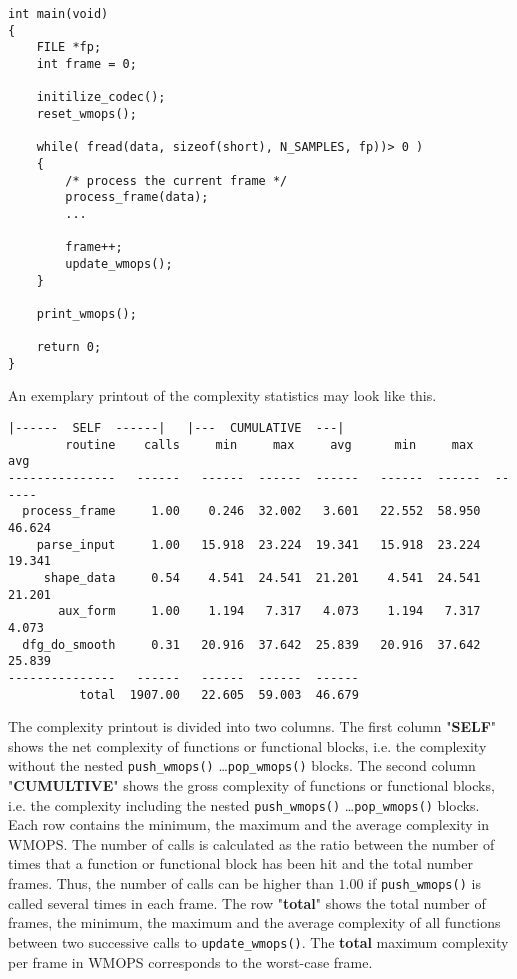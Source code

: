 \begin{Verbatim}[fontsize=\small]
int main(void)
{
    FILE *fp;
    int frame = 0;

    initilize_codec();
    reset_wmops();

    while( fread(data, sizeof(short), N_SAMPLES, fp))> 0 )
    {
        /* process the current frame */
        process_frame(data);
        ...

        frame++;
        update_wmops();
    }

    print_wmops();

    return 0;
}
\end{Verbatim}

An exemplary printout of the complexity statistics may look like this.

\begin{Verbatim}[fontsize=\small]
                           |------  SELF  ------|   |---  CUMULATIVE  ---|
        routine    calls     min     max     avg      min     max     avg
---------------   ------   ------  ------  ------   ------  ------  ------
  process_frame     1.00    0.246  32.002   3.601   22.552  58.950  46.624
    parse_input     1.00   15.918  23.224  19.341   15.918  23.224  19.341
     shape_data     0.54    4.541  24.541  21.201    4.541  24.541  21.201
       aux_form     1.00    1.194   7.317   4.073    1.194   7.317   4.073
  dfg_do_smooth     0.31   20.916  37.642  25.839   20.916  37.642  25.839
---------------   ------   ------  ------  ------
          total  1907.00   22.605  59.003  46.679
\end{Verbatim}

The complexity printout is divided into two columns. The first column "\textbf{SELF}" shows the net complexity of functions or functional blocks, i.e. the complexity without the nested \verb|push_wmops()| \ldots \verb|pop_wmops()|  blocks. The second column  "\textbf{CUMULTIVE}" shows the gross complexity of functions or functional blocks, i.e. the complexity including the nested \verb|push_wmops()| \ldots \verb|pop_wmops()|  blocks. Each row contains the minimum, the maximum and the average complexity in WMOPS. The number of calls is calculated as the ratio between the number of times that a function or functional block has been hit and the total number frames. Thus, the number of calls can be higher than \(1.00\) if \verb|push_wmops()| is called several times in each frame. The row "\textbf{total}" shows the total number of frames, the minimum, the maximum and the average complexity of all functions between two successive calls to \verb|update_wmops()|. The \textbf{total} maximum complexity per frame in WMOPS corresponds to the worst-case frame.

